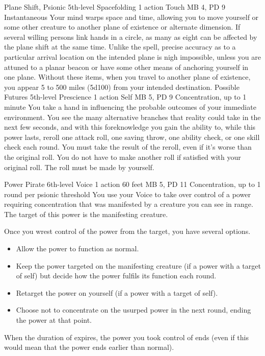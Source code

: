 \DndPowerHeader%
    {Plane Shift, Psionic\label{pwr:plane_shift_psionic}}
    {5th-level Spacefolding}
    {1 action}
    {Touch}
    {MB 4, PD 9}
    {Instantaneous}
Your mind warps space and time, allowing
you to move yourself or some other creature to another plane
of existence or alternate dimension. If several willing persons
link hands in a circle, as many as eight can be affected by
the plane shift at the same time. Unlike the  spell, precise accuracy as to a particular arrival
location on the intended plane is nigh impossible, unless
you are attuned to a planar beacon or have some other means
of anchoring yourself in one plane. Without these items, when
you travel to another plane of existence, you appear 5 to
500 miles (5d100) from your intended destination.
\DndPowerHeader%
    {Possible Futures\label{pwr:possible_futures}}
    {5th-level Prescience}
    {1 action}
    {Self}
    {MB 5, PD 9}
    {Concentration, up to 1 minute}
You take a hand in influencing the probable
outcomes of your immediate environment. You see the many alternative
branches that reality could take in the next few seconds,
and with this foreknowledge you gain the ability to, while
this power lasts, reroll one attack roll, one saving throw,
one ability check, or one skill check each round. You must
take the result of the reroll, even if it's worse than the
original roll. You do not have to make another roll if satisfied
with your original roll. The roll must be made by yourself.

\DndPowerHeader%
    {Power Pirate\label{pwr:power_pirate}}
    {6th-level Voice}
    {1 action}
    {60 feet}
    {MB 5, PD 11}
    {Concentration, up to 1 round per psionic threshold}
You use your Voice to take over control of a power
requiring concentration that was manifested
by a creature you can see in range.
The target of this power is the manifesting creature.

Once you wrest control of the power from the target,
you have several options.
\begin{itemize}
  \item Allow the power to function as normal.
  \item Keep the power targeted on the manifesting creature
        (if a power with a target of self) but decide how the power
        fulfils its function each round.
  \item Retarget the power on yourself (if a power with a target of self).
  \item Choose not to concentrate on the usurped power
          in the next round, ending the power at that point.
\end{itemize}
When the duration of  expires,
the power you took control of ends
(even if this would mean that the power ends earlier than normal).

